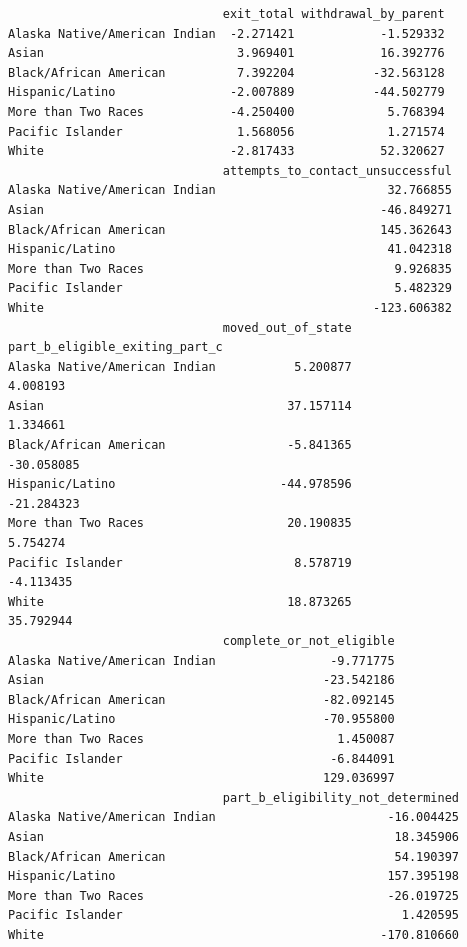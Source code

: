 \documentclass[
  letterpaper,
  DIV=11,
  numbers=noendperiod]{scrartcl}
\begin{document}
\begin{verbatim}
                              exit_total withdrawal_by_parent
Alaska Native/American Indian  -2.271421            -1.529332
Asian                           3.969401            16.392776
Black/African American          7.392204           -32.563128
Hispanic/Latino                -2.007889           -44.502779
More than Two Races            -4.250400             5.768394
Pacific Islander                1.568056             1.271574
White                          -2.817433            52.320627
                              attempts_to_contact_unsuccessful
Alaska Native/American Indian                        32.766855
Asian                                               -46.849271
Black/African American                              145.362643
Hispanic/Latino                                      41.042318
More than Two Races                                   9.926835
Pacific Islander                                      5.482329
White                                              -123.606382
                              moved_out_of_state part_b_eligible_exiting_part_c
Alaska Native/American Indian           5.200877                       4.008193
Asian                                  37.157114                       1.334661
Black/African American                 -5.841365                     -30.058085
Hispanic/Latino                       -44.978596                     -21.284323
More than Two Races                    20.190835                       5.754274
Pacific Islander                        8.578719                      -4.113435
White                                  18.873265                      35.792944
                              complete_or_not_eligible
Alaska Native/American Indian                -9.771775
Asian                                       -23.542186
Black/African American                      -82.092145
Hispanic/Latino                             -70.955800
More than Two Races                           1.450087
Pacific Islander                             -6.844091
White                                       129.036997
                              part_b_eligibility_not_determined
Alaska Native/American Indian                        -16.004425
Asian                                                 18.345906
Black/African American                                54.190397
Hispanic/Latino                                      157.395198
More than Two Races                                  -26.019725
Pacific Islander                                       1.420595
White                                               -170.810660
\end{verbatim}
\end{document}
